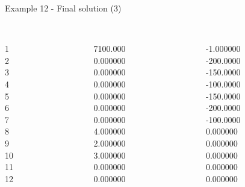 \begin{frame}{Example 12 - Final solution (3)}
\footnotesize
\begin{columns}[t]
\begin{column}{0.3\textwidth}
\\
1\\
2\\
3\\
4\\
5\\
6\\
7\\
8\\
9\\
10\\
11\\
12\\
\end{column}
\begin{column}{0.3\textwidth}
\\
7100.000\\
0.000000\\
0.000000\\
0.000000\\
0.000000\\
0.000000\\
0.000000\\
4.000000\\
2.000000\\
3.000000\\
0.000000\\
0.000000\\
\end{column}

\begin{column}{0.3\textwidth}
\\
-1.000000\\
-200.0000\\
-150.0000\\
-100.0000\\
-150.0000\\
-200.0000\\
-100.0000\\
0.000000\\
0.000000\\
0.000000\\
0.000000\\
0.000000\\
\end{column}
\end{columns}
\end{frame}

